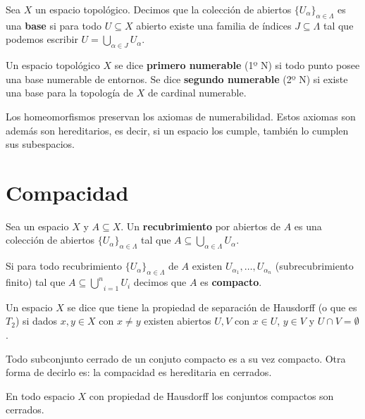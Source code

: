 \documentclass[GTS.tex]{subfiles}
\begin{document}
\begin{defi} Sea $X$ un espacio topológico. Decimos que la colección de abiertos $\{U_\alpha\}_{\alpha\in\Lambda}$ es una \textbf{base} si para todo $U\subseteq X$ abierto existe una familia de índices $J\subseteq\Lambda$ tal que podemos escribir $U=\bigcup_{\alpha\in J}U_\alpha$.
\end{defi}

\begin{defi}
Un espacio topológico $X$ se dice \textbf{primero numerable} (1º N) si todo punto posee una base numerable de entornos. Se dice \textbf{segundo numerable} (2º N) si existe una base para la topología de $X$ de cardinal numerable.
\end{defi}

\begin{prop}
Los homeomorfismos preservan los axiomas de numerabilidad. Estos axiomas son además son hereditarios, es decir, si un espacio los cumple, también lo cumplen sus subespacios.
\end{prop}

\section{Compacidad}
\begin{defi}Sea un espacio $X$ y $A\subseteq X$. Un \textbf{recubrimiento} por abiertos de $A$ es una colección de abiertos $\{U_\alpha\}_{\alpha\in\Lambda}$ tal que $A\subseteq\underset{\alpha\in\Lambda}{\bigcup}U_\alpha$.
\end{defi}
\begin{defi} Si para todo recubrimiento $\{U_\alpha\}_{\alpha\in\Lambda}$ de $A$ existen $U_{\alpha_1},\dots,U_{\alpha_n}$ (subrecubrimiento finito) tal que $A\subseteq\underset{i=1}{\overset{n}{\bigcup}}U_i$ decimos que $A$ es \textbf{compacto}.
\end{defi}
\begin{defi} Un espacio $X$ se dice que tiene la propiedad de separación de Hausdorff (o que es $T_2$) si dados $x,y\in X$ con $x\neq y$ existen abiertos $U,V$ con $x\in U$, $y\in V$ y $U\cap V=\emptyset$.
\end{defi}
\begin{prop} Todo subconjunto cerrado de un conjuto compacto es a su vez compacto. Otra forma de decirlo es: la compacidad es hereditaria en cerrados.
\end{prop}
\begin{prop} En todo espacio $X$ con propiedad de Hausdorff los conjuntos compactos son cerrados.
\end{prop}
\end{document}
